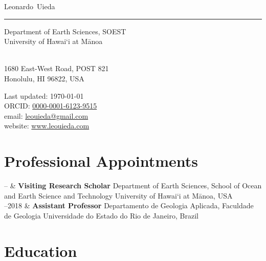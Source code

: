 \documentclass[11pt, a4paper]{article}
\makeatletter
\newcommand{\UHM}{University of Hawai`i at M\={a}noa}
\newcommand{\FirstName}{Leonardo}
\newcommand{\LastName}{Uieda}
\newcommand{\MyName}{\FirstName\ \LastName}
\newcommand{\Email}{leouieda@gmail.com}
\newcommand{\Website}{www.leouieda.com}
\newcommand{\ORCID}{0000-0001-6123-9515}
\newcommand{\Affiliation}{
    Department of Earth Sciences, SOEST
    \\
    \UHM
}
\newcommand{\Address}{
    1680 East-West Road, POST 821
    \\
    Honolulu, HI 96822, USA
}
\newcommand{\Duration}[2]{\fontsize{10pt}{0}\selectfont #1--#2}
\newcommand{\Ongoing}{}
\makeatother
\begin{document}
\thispagestyle{empty}

{\fontsize{24pt}{0}\selectfont\MyName}\\[-0.1cm]
\rule{\textwidth}{0.2pt}
\begin{minipage}[t]{0.595\textwidth}
    \Affiliation
    \\
    \Address
\end{minipage}
\begin{minipage}[t]{0.4\textwidth}
    \begin{flushright}
		Last updated: \monthyear\today
		\\
        ORCID: \href{https://orcid.org/\ORCID}{\ORCID}
        \\
        email: \href{mailto:\Email}{\Email}
        \\
        website: \href{https://\Website}{\Website}
    \end{flushright}
\end{minipage}

\section*{Professional Appointments}

\begin{EntriesTable}
    \Duration{2017}{\Ongoing}  &
    \textbf{Visiting Research Scholar}
    \newline
    Department of Earth Sciences,
    School of Ocean and Earth Science and Technology
    \newline
    \UHM, USA
    \\
    \Duration{2014}{2018}  &
    \textbf{Assistant Professor}
    \newline
    Departamento de Geologia Aplicada, Faculdade de Geologia
    \newline
    Universidade do Estado do Rio de Janeiro, Brazil
\end{EntriesTable}


\section*{Education}
\end{document}
